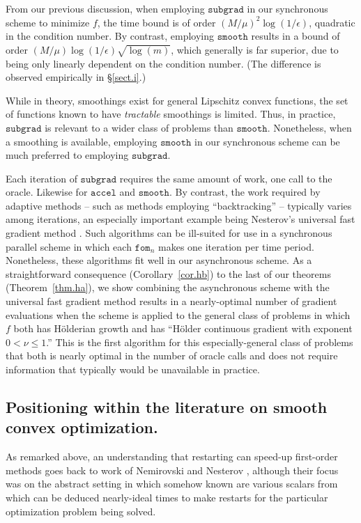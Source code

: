 \documentclass[reqno, 11pt]{amsart}
\numberwithin{equation}{section}
\newcommand{\fom}{\mathtt{fom}}
\newcommand{\subgrad}{\mathtt{subgrad}}
\newcommand{\accel}{\mathtt{accel}}
\newcommand{\smooth}{\mathtt{smooth}}
\begin{document}
From our previous discussion, when employing $ \subgrad $ in our synchronous scheme to minimize $ f $, the time bound is of order $ (M/\mu)^2 \log(1/\epsilon) $, quadratic in the condition number. By contrast, employing $ \smooth $ results in a bound of order $ (M/\mu)  \log(1/\epsilon) \sqrt{ \log(m)}$, which generally is far superior, due to being only linearly dependent on the condition number. (The difference is observed empirically in \S\ref{sect.i}.)  

While in theory, smoothings exist for general Lipschitz convex functions, the set of functions known to have {\em  tractable} smoothings is limited. Thus, in practice, $ \subgrad $ is relevant to a wider class of problems than $ \smooth $. Nonetheless, when a smoothing is available, employing $ \smooth $ in our synchronous scheme can be much preferred to employing $ \subgrad $. 
 
Each iteration of $ \subgrad $  requires the same amount of work, one call to the oracle. Likewise for $ \accel $ and $ \smooth $. By contrast, the work required by adaptive methods -- such as methods employing ``backtracking'' -- typically varies among iterations, an especially important example being Nesterov's universal fast gradient method \cite{nesterov2015universal}. Such algorithms can be ill-suited  for use in a synchronous parallel scheme in which each $ \fom_n $ makes one iteration per time period.  Nonetheless, these algorithms fit well in our asynchronous scheme.  As a straightforward consequence (Corollary~\ref{cor.hb}) to the last of our theorems (Theorem~\ref{thm.ha}), we show combining the asynchronous scheme with the universal fast gradient method results in a nearly-optimal number of gradient evaluations when the scheme is applied to the general class of problems in which $ f $ both has H\"{o}lderian growth and has ``H\"{o}lder continuous gradient with exponent $ 0 < \nu \leq 1 $.'' This is the first algorithm for this especially-general class of problems that both is nearly optimal in the number of oracle calls and does not require information that typically would be unavailable in practice.


\subsection{Positioning within the literature on smooth convex optimization.} \label{sect.ae} As remarked above, an understanding that restarting can speed-up first-order methods goes back to work of Nemirovski and Nesterov \cite{NemNes85}, although their focus was on the abstract setting in which somehow known are various scalars from which can be deduced nearly-ideal times to make restarts for the particular optimization problem being solved. 
\end{document}
